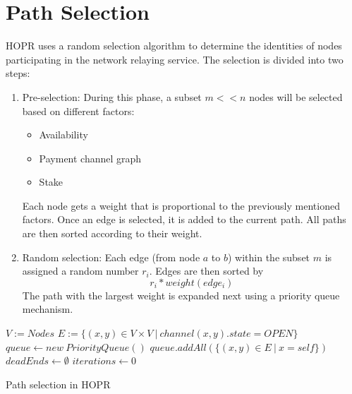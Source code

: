 \section{Path Selection}
HOPR uses a random selection algorithm to determine the identities of nodes participating in the network relaying service.
The selection is divided into two steps:
\begin{enumerate}
    \item Pre-selection:
          During this phase, a subset $m<<n$ nodes will be selected based on different factors:
          \begin{itemize}
              \item Availability
              \item Payment channel graph
              \item Stake
          \end{itemize}
          Each node gets a weight that is proportional to the previously mentioned factors.
          Once an edge is selected, it is added to the current path. All paths are then sorted according to their weight. 
    \item Random selection: Each edge (from node $a$ to $b$) within the subset $m$ is assigned a random number $r_i$. Edges are then sorted by $$r_i*weight(edge_i)$$ The path with the largest weight is expanded next using a priority queue mechanism.
\end{enumerate}
\begin{algorithm}[H]
    \SetAlgoNoLine
    \DontPrintSemicolon
    $ V := Nodes$\;
    $ E := \{ (x, y) \in V \times V \ | \ channel(x,y).state = OPEN \}$\;
    \;
    $queue \leftarrow new \ PriorityQueue()$\;
    $queue.addAll(\{ (x,y) \in E \ | \ x = self \})$\;
    $deadEnds \leftarrow \emptyset$\;
    $iterations \leftarrow 0$\;
    \Return{$\bot$}
    \caption{Path selection in HOPR}
\end{algorithm}

